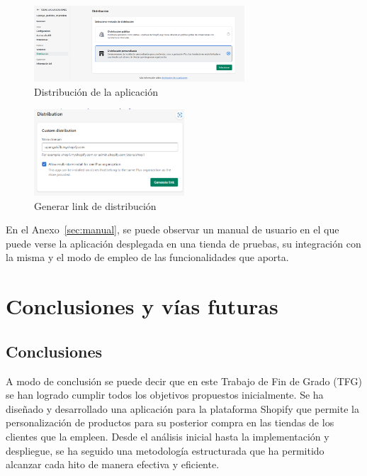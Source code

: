 \documentclass[11pt]{article}
\begin{document}
\begin{figure}[H]
    \centering
    \includegraphics[width=0.7\textwidth]{imagenes/distribucionAppEnlace.png}
    \caption{\label{fig:DistributionAppPartners}Distribución de la aplicación}
    \vspace{\fill}
\end{figure}

\begin{figure}[H]
    \centering
    \includegraphics[width=0.5\textwidth]{imagenes/generarLinkDistribution.png}
    \caption{\label{fig:generarLinkDistribution}Generar link de distribución}
    \vspace{\fill}
\end{figure}

En el Anexo~\ref{sec:manual}, se puede observar un manual de usuario en el que puede verse la aplicación desplegada en una tienda de pruebas, su integración
con la misma y el modo de empleo de las funcionalidades que aporta.

\clearpage
\section{Conclusiones y vías futuras}

\subsection{Conclusiones}
A modo de conclusión se puede decir que en este Trabajo de Fin de Grado (TFG) se han logrado cumplir todos
los objetivos propuestos inicialmente. Se ha diseñado y desarrollado una aplicación para la plataforma Shopify que 
permite la personalización de productos para su posterior compra en las tiendas de los clientes que la empleen.
Desde el análisis inicial hasta la implementación y despliegue, se ha seguido una metodología estructurada que ha permitido
alcanzar cada hito de manera efectiva y eficiente.
\end{document}
